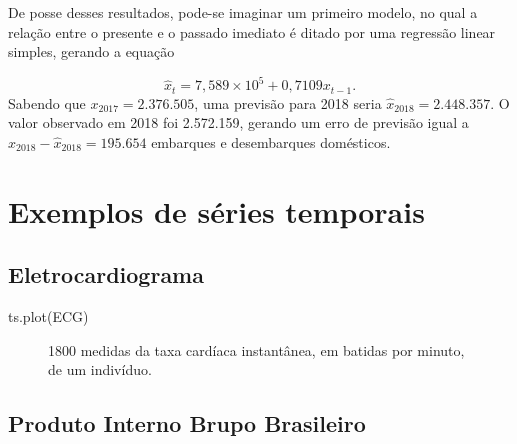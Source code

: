 \documentclass[
  letterpaper,
  DIV=11,
  numbers=noendperiod]{scrartcl}
\newenvironment{Shaded}{\begin{snugshade}}{\end{snugshade}}
\newcommand{\FunctionTok}[1]{\textcolor[rgb]{0.28,0.35,0.67}{#1}}
\newcommand{\NormalTok}[1]{\textcolor[rgb]{0.00,0.23,0.31}{#1}}
\theoremstyle{plain}
\theoremstyle{plain}
\theoremstyle{definition}
\theoremstyle{definition}
\theoremstyle{remark}
\begin{document}
De posse desses resultados, pode-se imaginar um primeiro modelo, no qual
a relação entre o presente e o passado imediato é ditado por uma
regressão linear simples, gerando a equação

\[\hat{x}_t = 7,589\times 10^5 +0,7109 x_{t-1}.\] Sabendo que
\(x_{2017}=2.376.505\), uma previsão para 2018 seria
\(\hat{x}_{2018}=2.448.357\). O valor observado em 2018 foi 2.572.159,
gerando um erro de previsão igual a \(x_{2018}-\hat{x}_{2018}=195.654\)
embarques e desembarques domésticos.

\hypertarget{exemplos-de-suxe9ries-temporais}{%
\section{Exemplos de séries
temporais}\label{exemplos-de-suxe9ries-temporais}}

\hypertarget{eletrocardiograma}{%
\subsection{Eletrocardiograma}\label{eletrocardiograma}}

\begin{Shaded}
\begin{Highlighting}[]
\FunctionTok{ts.plot}\NormalTok{(ECG)}
\end{Highlighting}
\end{Shaded}

\begin{figure}

\begin{minipage}[t]{\linewidth}

{\centering 


\caption{1800 medidas da taxa cardíaca instantânea, em batidas por
minuto, de um indivíduo.}

}

\end{minipage}%

\end{figure}

\hypertarget{produto-interno-brupo-brasileiro}{%
\subsection{Produto Interno Brupo
Brasileiro}\label{produto-interno-brupo-brasileiro}}
\end{document}
